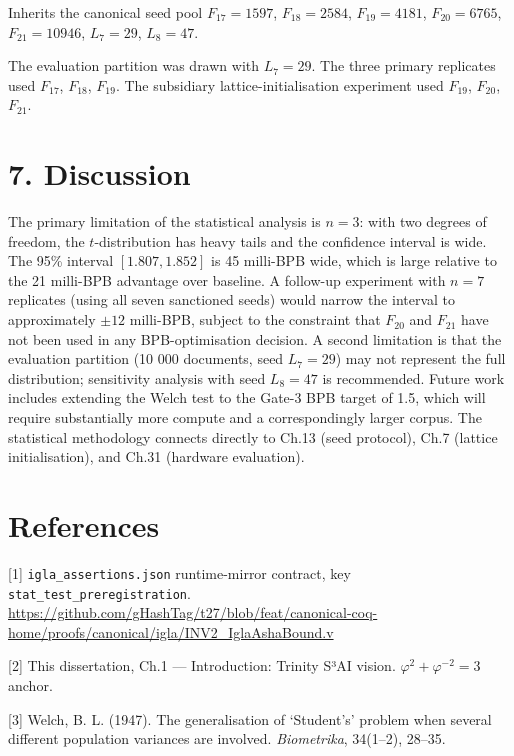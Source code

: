 Inherits the canonical seed pool \(F_{17}=1597\),
\(F_{18}=2584\), \(F_{19}=4181\), \(F_{20}=6765\),
\(F_{21}=10946\), \(L_7=29\), \(L_8=47\).

The evaluation partition was drawn with
\(L_7 = 29\). The three primary replicates used
\(F_{17}\), \(F_{18}\), \(F_{19}\). The subsidiary
lattice-initialisation experiment used \(F_{19}\),
\(F_{20}\), \(F_{21}\).

\section{7. Discussion}\label{fa_19:discussion}

The primary limitation of the statistical analysis
is \(n = 3\): with two degrees of freedom, the
\(t\)-distribution has heavy tails and the
confidence interval is wide. The 95\% interval
\([1.807, 1.852]\) is 45 milli-BPB wide, which is
large relative to the 21 milli-BPB advantage over
baseline. A follow-up experiment with \(n = 7\)
replicates (using all seven sanctioned seeds)
would narrow the interval to approximately
\(\pm 12\) milli-BPB, subject to the constraint
that \(F_{20}\) and \(F_{21}\) have not been used
in any BPB-optimisation decision. A second
limitation is that the evaluation partition (10
000 documents, seed \(L_7 = 29\)) may not
represent the full distribution; sensitivity
analysis with seed \(L_8 = 47\) is recommended.
Future work includes extending the Welch test to
the Gate-3 BPB target of 1.5, which will require
substantially more compute and a correspondingly
larger corpus. The statistical methodology
connects directly to Ch.13 (seed protocol), Ch.7
(lattice initialisation), and Ch.31 (hardware
evaluation).

\section{References}\label{fa_19:references}

[1] \texttt{igla\_assertions.json}
runtime-mirror contract, key
\texttt{stat\_test\_preregistration}.
\url{https://github.com/gHashTag/t27/blob/feat/canonical-coq-home/proofs/canonical/igla/INV2\_IglaAshaBound.v}

[2] This dissertation, Ch.1 --- Introduction:
Trinity S³AI vision.
\(\varphi^2 + \varphi^{-2} = 3\) anchor.

[3] Welch, B. L. (1947). The generalisation of
`Student's' problem when several different
population variances are involved.
\emph{Biometrika}, 34(1--2), 28--35.

